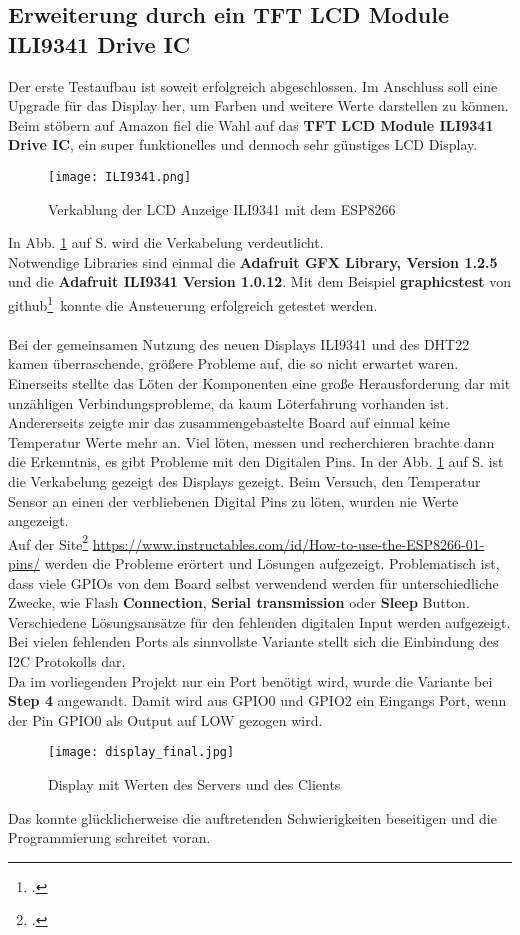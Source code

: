 \documentclass[12pt,a4paper]{scrartcl}	%
\begin{document}
\subsection{Erweiterung durch ein TFT LCD Module ILI9341 Drive IC}
Der erste Testaufbau ist soweit erfolgreich abgeschlossen. Im Anschluss soll eine Upgrade für das Display her, um Farben und weitere Werte darstellen zu können. \\
Beim stöbern auf Amazon fiel die Wahl auf das \textbf{TFT LCD Module ILI9341 Drive IC}, ein super funktionelles und dennoch sehr günstiges LCD Display.\\
\begin{figure}[htb]
	\centering
	\texttt{[image: ILI9341.png]}
	\caption{Verkablung der LCD Anzeige ILI9341 mit dem ESP8266}
	\label{ILI9341}
\end{figure}
In Abb. \ref{ILI9341} auf S. \pageref{ILI9341} wird die Verkabelung verdeutlicht.\\
Notwendige Libraries sind einmal die \textbf{Adafruit GFX Library, Version 1.2.5} und die \textbf{Adafruit ILI9341 Version 1.0.12}. Mit dem Beispiel \textbf{graphicstest} von github\footcite[vgl.][Abruf am 16.07.2018]{ili}~konnte die Ansteuerung erfolgreich getestet werden.\\
\\
Bei der gemeinsamen Nutzung des neuen Displays ILI9341 und des DHT22 kamen überraschende, größere Probleme auf, die so nicht erwartet waren.\\
Einerseits stellte das Löten der Komponenten eine große Herausforderung dar mit unzähligen Verbindungsprobleme, da kaum Löterfahrung vorhanden ist.
Andererseits zeigte mir das zusammengebastelte Board auf einmal keine Temperatur Werte mehr an. Viel löten, messen und recherchieren brachte dann die Erkenntnis, es gibt Probleme mit den Digitalen Pins.
In der Abb. \ref{ILI9341} auf S. \pageref{ILI9341} ist die Verkabelung gezeigt des Displays gezeigt. Beim Versuch, den Temperatur Sensor an einen der verbliebenen Digital Pins zu löten, wurden nie Werte angezeigt.\\
Auf der Site\footcite[vgl.][Abruf am 19.07.2018]{i2c} \url{https://www.instructables.com/id/How-to-use-the-ESP8266-01-pins/} werden die Probleme erörtert und Lösungen aufgezeigt. Problematisch ist, dass viele GPIOs von dem Board selbst verwendend werden für unterschiedliche Zwecke, wie Flash \textbf{Connection}, \textbf{Serial transmission} oder \textbf{Sleep} Button. Verschiedene Lösungsansätze für den fehlenden digitalen Input werden aufgezeigt. Bei vielen fehlenden Ports als sinnvollste Variante stellt sich die Einbindung des I2C Protokolls dar.\\
Da im vorliegenden Projekt nur ein Port benötigt wird, wurde die Variante bei \textbf{Step 4} angewandt. Damit wird aus GPIO0 und GPIO2 ein Eingangs Port, wenn der Pin GPIO0 als Output auf LOW gezogen wird.
\begin{figure}[htb]
	\centering
	\texttt{[image: display\_final.jpg]}
	\caption{Display mit Werten des Servers und des Clients}
\end{figure}
Das konnte glücklicherweise die auftretenden Schwierigkeiten beseitigen und die Programmierung schreitet voran.
\end{document}
